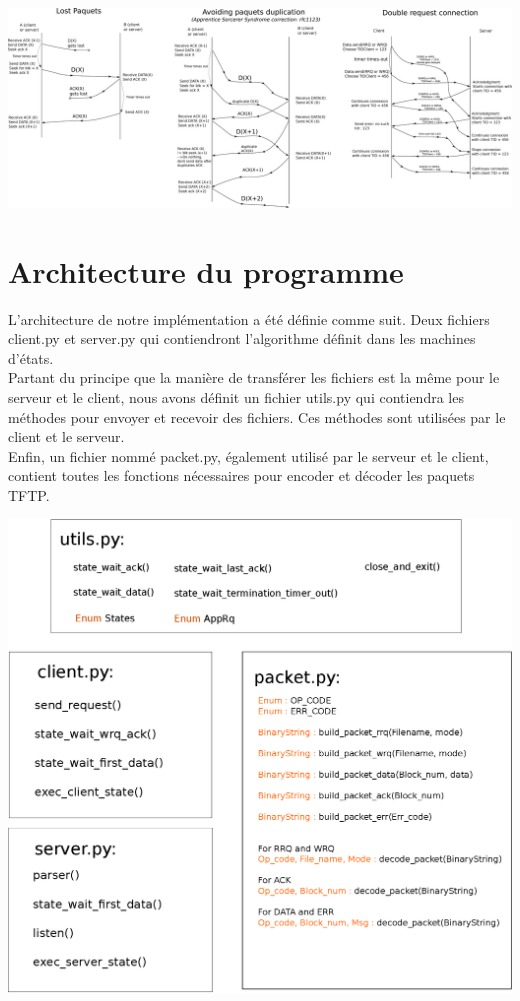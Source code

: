 \documentclass[11pt,a4paper]{article}
\begin{document}
  \begin{center}
	  \includegraphics[width=1\textwidth]{ressources/errors_time-sequence.eps}  
  \end{center}	
	
  \section{Architecture du programme}
  
  \par L'architecture de notre implémentation a été définie comme suit. Deux fichiers client.py et server.py qui contiendront l'algorithme définit dans les machines d'états. 
  \\ Partant du principe que la manière de transférer les fichiers est la même pour le serveur et le client, nous avons définit un fichier utils.py qui contiendra les méthodes pour envoyer et recevoir des fichiers. Ces méthodes sont utilisées par le client et le serveur. 
  \\ Enfin, un fichier nommé packet.py, également utilisé par le serveur et le client, contient toutes les fonctions nécessaires pour encoder et décoder les paquets TFTP.
  
  \begin{center}
  	\includegraphics[width=1\textwidth]{ressources/architecture.eps}     
  \end{center}
\end{document}
